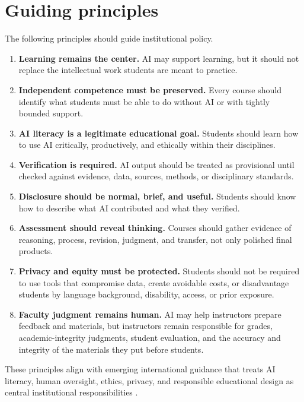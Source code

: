 \documentclass{SIAMbook2023}
\begin{document}
\section{Guiding principles}
\label{u:sec:principles}%

The following principles should guide institutional policy.

\begin{enumerate}
  \item \textbf{Learning remains the center.} AI may support learning, but it should not replace the intellectual work students are meant to practice.
  \item \textbf{Independent competence must be preserved.} Every course should identify what students must be able to do without AI or with tightly bounded support.
  \item \textbf{AI literacy is a legitimate educational goal.} Students should learn how to use AI critically, productively, and ethically within their disciplines.
  \item \textbf{Verification is required.} AI output should be treated as provisional until checked against evidence, data, sources, methods, or disciplinary standards.
  \item \textbf{Disclosure should be normal, brief, and useful.} Students should know how to describe what AI contributed and what they verified.
  \item \textbf{Assessment should reveal thinking.} Courses should gather evidence of reasoning, process, revision, judgment, and transfer, not only polished final products.
  \item \textbf{Privacy and equity must be protected.} Students should not be required to use tools that compromise data, create avoidable costs, or disadvantage students by language background, disability, access, or prior exposure.
  \item \textbf{Faculty judgment remains human.} AI may help instructors prepare feedback and materials, but instructors remain responsible for grades, academic-integrity judgments, student evaluation, and the accuracy and integrity of the materials they put before students.
\end{enumerate}

These principles align with emerging international guidance that treats AI literacy, human oversight, ethics, privacy, and responsible educational design as central institutional responsibilities \citep{miao2023guidance,miao2024aia,miao2024aib,europeancommission2022ethical,oecd2026digital}.
\end{document}
